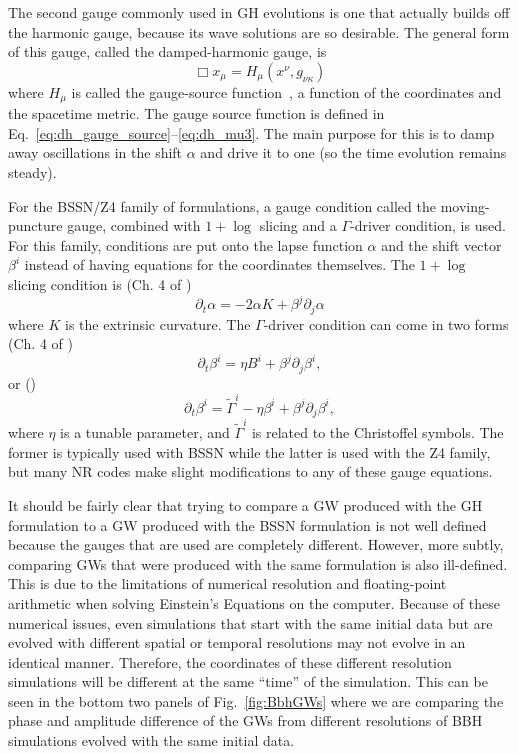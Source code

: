 \begin{bibunit}[unsrtnat]
The second gauge commonly used in GH evolutions is one that actually builds off
the harmonic gauge, because its wave solutions are so desirable. The general
form of this gauge, called the damped-harmonic gauge, is
\begin{equation}
  \Box x_\mu = H_\mu(x^\nu, g_{\nu\kappa})
\end{equation}
where $H_\mu$ is called the gauge-source function~\cite{Szilagyi:2009qz},
a function of the coordinates and the spacetime metric. The gauge source
function is defined in Eq.~\ref{eq:dh_gauge_source}--\ref{eq:dh_mu3}. The main
purpose for this is to damp away oscillations in the shift $\alpha$ and drive it
to one (so the time evolution remains steady).

For the BSSN/Z4 family of formulations, a gauge condition called the
moving-puncture gauge, combined with $1+\log$ slicing and a
$\Gamma$-driver condition, is used. For this family, conditions are put onto the
lapse function $\alpha$ and the shift vector $\beta^i$ instead of having
equations for the coordinates themselves. The $1+\log$ slicing condition is (Ch.
4 of \cite{Baumgarte:2010ndz})
\begin{equation}\label{eq:1_plus_log}
  \partial_t \alpha = -2\alpha K + \beta^j\partial_j\alpha
\end{equation}
where $K$ is the extrinsic curvature. The $\Gamma$-driver condition can come
in two forms (Ch. 4 of \cite{Baumgarte:2010ndz})
\begin{equation}\label{eq:gamma_driver_1}
  \partial_t \beta^i = \eta B^i + \beta^j\partial_j\beta^i,
\end{equation}
or (\cite{Hilditch:2012fp})
\begin{equation}\label{eq:gamma_driver_2}
  \partial_t \beta^i = \tilde{\Gamma}^i - \eta\beta^i + \beta^j\partial_j\beta^i,
\end{equation}
where $\eta$ is a tunable parameter, and $\tilde{\Gamma}^i$ is related to the
Christoffel symbols. The former is typically used with BSSN while the latter is
used with the Z4 family, but many NR codes make slight modifications to any of
these gauge equations.

It should be fairly clear that trying to compare a GW produced with the GH
formulation to a GW produced with the BSSN formulation is not well defined
because the gauges that are used are completely different. However, more subtly,
comparing GWs that were produced with the same formulation is also ill-defined.
This is due to the limitations of numerical resolution and floating-point
arithmetic when solving Einstein's Equations on the computer. Because of these
numerical issues, even simulations that start with the same initial data but are
evolved with different spatial or temporal resolutions may not evolve in an
identical manner. Therefore, the coordinates of these different resolution
simulations will be different at the same ``time'' of the simulation. This can
be seen in the bottom two panels of Fig.~\ref{fig:BbhGWs} where we are
comparing the phase and amplitude difference of the GWs from different
resolutions of BBH simulations evolved with the same initial data.


\end{bibunit}

